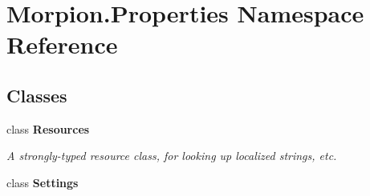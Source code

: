 \hypertarget{namespace_morpion_1_1_properties}{}\section{Morpion.\+Properties Namespace Reference}
\label{namespace_morpion_1_1_properties}
\subsection*{Classes}
\begin{DoxyCompactItemize}
\item 
class {\bfseries Resources}
\begin{DoxyCompactList}\small\item\em A strongly-\/typed resource class, for looking up localized strings, etc. \end{DoxyCompactList}\item 
class {\bfseries Settings}
\end{DoxyCompactItemize}
